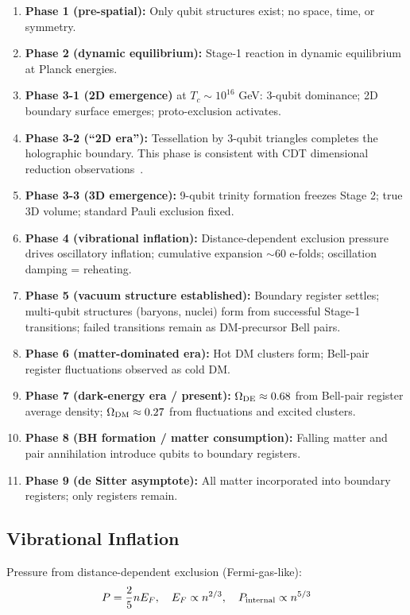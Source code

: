 \documentclass[11pt,a4paper]{article}
\begin{document}
\begin{enumerate}[leftmargin=*]
\item \textbf{Phase 1 (pre-spatial):} Only qubit structures exist; no space, time, or symmetry.
\item \textbf{Phase 2 (dynamic equilibrium):} Stage-1 reaction in dynamic equilibrium at Planck energies.
\item \textbf{Phase 3-1 (2D emergence)} at $T_c \sim 10^{16}$ GeV: 3-qubit dominance; 2D boundary surface emerges; proto-exclusion activates.
\item \textbf{Phase 3-2 (``2D era''):} Tessellation by 3-qubit triangles completes the holographic boundary. This phase is consistent with CDT dimensional reduction observations~\cite{Ambjorn2005}.
\item \textbf{Phase 3-3 (3D emergence):} 9-qubit trinity formation freezes Stage 2; true 3D volume; standard Pauli exclusion fixed.
\item \textbf{Phase 4 (vibrational inflation):} Distance-dependent exclusion pressure drives oscillatory inflation; cumulative expansion $\sim$60 e-folds; oscillation damping = reheating.
\item \textbf{Phase 5 (vacuum structure established):} Boundary register settles; multi-qubit structures (baryons, nuclei) form from successful Stage-1 transitions; failed transitions remain as DM-precursor Bell pairs.
\item \textbf{Phase 6 (matter-dominated era):} Hot DM clusters form; Bell-pair register fluctuations observed as cold DM.
\item \textbf{Phase 7 (dark-energy era / present):} $\Omega_{\rm DE} \approx 0.68$ from Bell-pair register average density; $\Omega_{\rm DM} \approx 0.27$ from fluctuations and excited clusters.
\item \textbf{Phase 8 (BH formation / matter consumption):} Falling matter and pair annihilation introduce qubits to boundary registers.
\item \textbf{Phase 9 (de Sitter asymptote):} All matter incorporated into boundary registers; only registers remain.
\end{enumerate}

\subsection{Vibrational Inflation}

Pressure from distance-dependent exclusion (Fermi-gas-like):
\begin{equation}
P = \frac{2}{5} n E_F, \quad E_F \propto n^{2/3}, \quad P_{\rm internal} \propto n^{5/3}
\end{equation}
\end{document}
